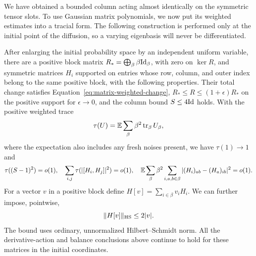 We have obtained a bounded column acting almost identically on the
symmetric tensor slots.  To use Gaussian matrix polynomials, we now put its
weighted estimates into a tracial form.  The following construction is
performed only at the initial point of the diffusion, so a varying
eigenbasis will never be differentiated.

\begin{lemma}\label{lem:matrix-blocks}
After enlarging the initial probability space by an independent uniform
variable, there are a positive block matrix
$R_*=\bigoplus_\beta\beta\mathrm{Id}_\beta$, with zero on $\ker R$, and symmetric
matrices $H_i$ supported on entries whose row, column, and outer index
belong to the same positive block, with the following properties.
Their total change satisfies Equation~\eqref{eq:matrix-weighted-change},
$R_*\le R\le(1+\epsilon)R_*$ on the positive support for
$\epsilon\to0$, and the column bound $S\le4\mathrm{Id}$ holds.  With the positive
weighted trace
\begin{equation}\label{eq:matrix-weighted-trace}
 \tau(U)=\mathbb E\sum_\beta\beta^2\operatorname{tr}_\beta U_\beta,
\end{equation}
where the expectation also includes any fresh noises present, we have
$\tau(1)\to1$ and
\begin{equation}\label{eq:matrix-tracial-defects}
 \tau((S-1)^2)=o(1),\quad
 \sum_{i,j}\tau(|[H_i,H_j]|^2)=o(1),\quad
 \mathbb E\sum_\beta\beta^2\sum_{i,a,b\in\beta}
 |(H_i)_{ab}-(H_a)_{ib}|^2=o(1).
\end{equation}
For a vector $v$ in a positive block define $H[v]=\sum_{i\in\beta}v_iH_i$.
We can further impose, pointwise,
\begin{equation}\label{eq:flattening-bound}
 \|H[v]\|_{\mathrm{HS}}\le2|v|.
\end{equation}
The bound uses ordinary, unnormalized Hilbert--Schmidt norm.
All the derivative-action and balance conclusions above continue to hold
for these matrices in the initial coordinates.
\end{lemma}
